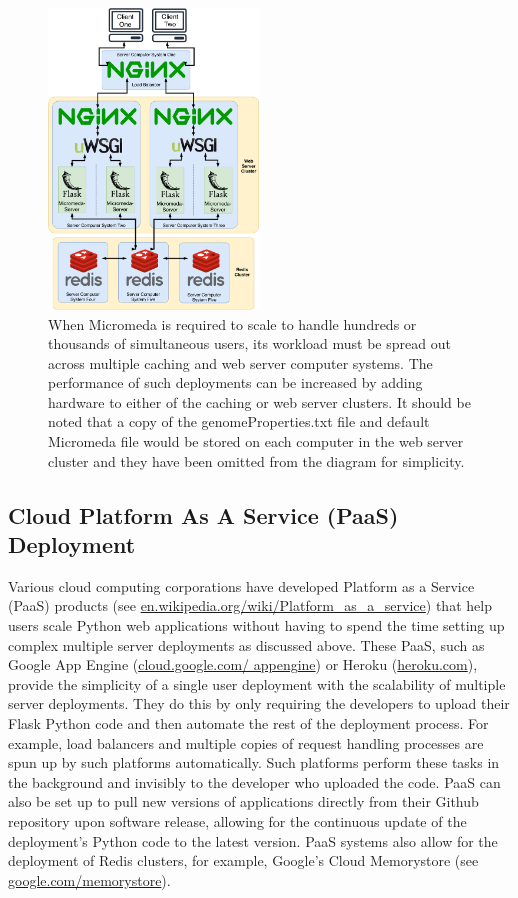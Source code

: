 \begin{figure}[!ht]
  \centering
	\includegraphics[width=0.50\textwidth]{media/micromeda-heavy-deployment.pdf}
	 \caption{When Micromeda is required to scale to handle hundreds or thousands of simultaneous users, its workload must be spread out across multiple caching and web server computer systems. The performance of such deployments can be increased by adding hardware to either of the caching or web server clusters. It should be noted that a copy of the genomeProperties.txt file and default Micromeda file would be stored on each computer in the web server cluster and they have been omitted from the diagram for simplicity.}
	 \label{fig:micromeda-large-deploy}
\end{figure}

\subsection{Cloud Platform As A Service (PaaS) Deployment}

Various cloud computing corporations have developed Platform as a Service (PaaS) \cite{lawton2008developing} products (see \href{en.wikipedia.org/wiki/Platform\_as\_a\_service}{en.wikipedia.org/wiki/Platform\_as\_a\_service}) that help users scale Python web applications without having to spend the time setting up complex multiple server deployments as discussed above. These PaaS, such as Google App Engine (\href{cloud.google.com/appengine}{cloud.google.com/ appengine}) or Heroku (\href{heroku.com}{heroku.com}), provide the simplicity of a single user deployment with the scalability of multiple server deployments. They do this by only requiring the developers to upload their Flask Python code and then automate the rest of the deployment process. For example, load balancers and multiple copies of request handling processes are spun up by such platforms automatically. Such platforms perform these tasks in the background and invisibly to the developer who uploaded the code. PaaS can also be set up to pull new versions of applications directly from their Github repository upon software release, allowing for the continuous update of the deployment's Python code to the latest version. PaaS systems also allow for the deployment of Redis clusters, for example, Google's Cloud Memorystore (see \href{cloud.google.com/memorystore/}{google.com/memorystore}).

